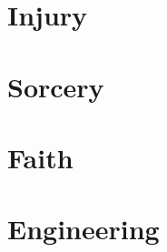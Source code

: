 \documentclass[oneside]{book}
\begin{document}
    \chapter{Injury}

    \chapter{Sorcery}

    \chapter{Faith}

    \chapter{Engineering}


\end{document}
